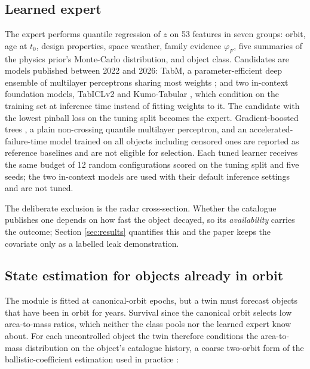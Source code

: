 \documentclass[3p,times]{elsarticle}
\begin{document}
\subsection{Learned expert}\label{learned-expert}

The expert performs quantile regression of \(z\) on 53 features in seven
groups: orbit, age at \(t_0\), design properties, space weather, family
evidence \(\varphi_F\), five summaries of the physics prior's
Monte-Carlo distribution, and object class. Candidates are models
published between 2022 and 2026: TabM, a parameter-efficient deep
ensemble of multilayer perceptrons sharing most weights
\citep{gorishniy2025tabm}; and two in-context foundation models,
TabICLv2 \citep{qu2025tabicl, qu2026tabiclv2} and Kumo-Tabular
\citep{nvidia2026kumo}, which condition on the training set at inference
time instead of fitting weights to it. The candidate with the lowest
pinball loss on the tuning split becomes the expert. Gradient-boosted
trees
\citep{chen2016xgboost, ke2017lightgbm, prokhorenkova2018catboost}, a
plain non-crossing quantile multilayer perceptron, and an
accelerated-failure-time model trained on all objects including censored
ones \citep{barnwal2022survival} are reported as reference baselines and
are not eligible for selection. Each tuned learner receives the same
budget of 12 random configurations scored on the tuning split and five
seeds; the two in-context models are used with their default inference
settings and are not tuned.

The deliberate exclusion is the radar cross-section. Whether the
catalogue publishes one depends on how fast the object decayed, so its
\emph{availability} carries the outcome; Section \ref{sec:results}
quantifies this and the paper keeps the covariate only as a labelled
leak demonstration.

\subsection{State estimation for objects already in
orbit}\label{state-estimation-for-objects-already-in-orbit}

The module is fitted at canonical-orbit epochs, but a twin must forecast
objects that have been in orbit for years. Survival since the canonical
orbit selects low area-to-mass ratios, which neither the class pools nor
the learned expert know about. For each uncontrolled object the twin
therefore conditions the area-to-mass distribution on the object's
catalogue history, a coarse two-orbit form of the ballistic-coefficient
estimation used in practice
\citep{gondelach2017ballistic, sang2013estimation, pardini2008impact}:
\end{document}
